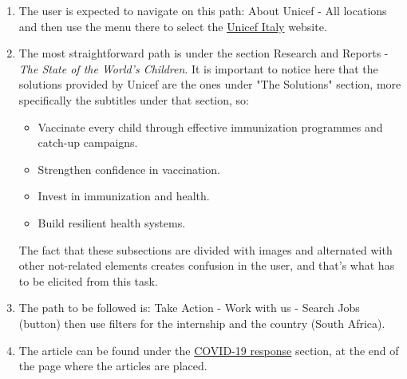 \documentclass[11pt]{article}
\begin{document}
\begin{enumerate}
		\item The user is expected to navigate on this path: About Unicef - All locations and then use the menu there to select the \href{https://www.unicef.it/}{Unicef Italy} website.
		\item The most straightforward path is under the section Research and Reports - \textit{The State of the World's Children}. It is important to notice here that the solutions provided by Unicef are the ones under "The Solutions" section, more specifically the subtitles under that section, so:
		\begin{itemize}
			\item Vaccinate every child through effective immunization programmes and catch-up campaigns.
			\item Strengthen confidence in vaccination.
			\item Invest in immunization and health.  
			\item Build resilient health systems. 
		\end{itemize}
		The fact that these subsections are divided with images and alternated with other not-related elements creates confusion in the user, and that's what has to be elicited from this task.
		\item The path to be followed is: Take Action - Work with us - Search Jobs (button) then use filters for the internship and the country (South Africa).
		\item The article can be found under the \href{https://www.unicef.org/coronavirus/covid-19}{COVID-19 response} section, at the end of the page where the articles are placed.
	\end{enumerate}
	
	
	
\end{document}

